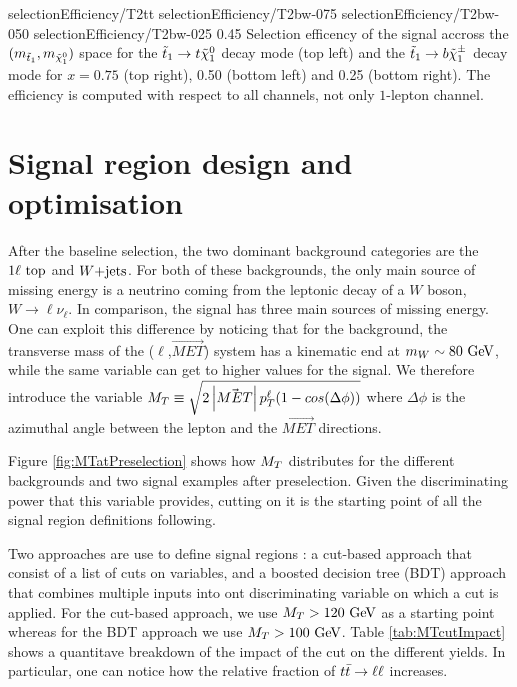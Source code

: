                           {selectionEfficiency/T2tt}
                          {selectionEfficiency/T2bw-075}
                          {selectionEfficiency/T2bw-050}
                          {selectionEfficiency/T2bw-025}
                          {0.45}
                          {Selection efficency of the signal accross the $(m_{\tilde{t}_1},m_{\tilde{\chi}_1^0})$ space for the $\tilde{t}_1 \rightarrow t \tilde{\chi}_1^0$ decay mode (top left) and the $\tilde{t}_1 \rightarrow b \tilde{\chi}_1^\pm$ decay mode for $x = 0.75$ (top right), 0.50 (bottom left) and 0.25 (bottom right). The efficiency is computed with respect to all channels, not only $1$-lepton channel.}


    \section{Signal region design and optimisation \label{sec:analysis_optimization}}

    After the baseline selection, the two dominant background categories are the $1\ell~\text{top}$
    and $\text{$W$+jets}$. For both of these backgrounds, the only main source of missing energy is a neutrino
    coming from the leptonic decay of a $W$ boson, $W \rightarrow \ell \nu_{\ell}$. In comparison,
    the signal has three main sources of missing energy. One can exploit this difference by noticing
    that for the background, the transverse mass of the ($\ell$,$\vec{MET}$) system has a kinematic
    end at $m_{W} \sim 80 ~\text{GeV}$, while the same variable can get to higher values for the signal.
    We therefore introduce the variable $M_T \equiv \sqrt{2 \left|\vec{MET}\right| p_T^\ell ( 1 - cos( \Delta \phi  ) ) }$
    where $\Delta \phi$ is the azimuthal angle between the lepton and the $\vec{MET}$ directions.

    Figure \ref{fig:MTatPreselection} shows how $M_T$ distributes for the different backgrounds and
    two signal examples after preselection. Given the discriminating power that this variable provides,
    cutting on it is the starting point of all the signal region definitions following. 
    
    Two approaches are use to define signal regions : a cut-based approach that consist of a list
    of cuts on variables, and a boosted decision tree (BDT) approach that combines multiple inputs into
    ont discriminating variable on which a cut is applied. For the cut-based approach, we use $M_T > 120 ~\text{GeV}$
    as a starting point whereas for the BDT approach we use $M_T > 100 ~\text{GeV}$. Table \ref{tab:MTcutImpact}
    shows a quantitave breakdown of the impact of the cut on the different yields. In particular, 
    one can notice how the relative fraction of $t\bar{t} \rightarrow \ell \ell$ increases.

